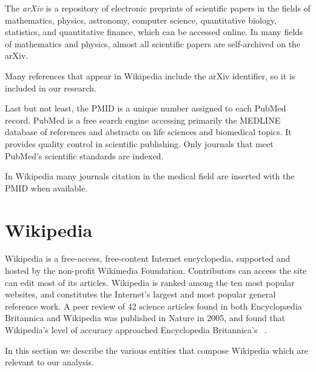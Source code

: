 The \emph{arXiv} is a repository of electronic preprints of scientific papers in the fields of mathematics, physics, astronomy, computer science, quantitative biology, statistics, and quantitative finance, which can be accessed online.
In many fields of mathematics and physics, almost all scientific papers are self-archived on the arXiv.

Many references that appear in Wikipedia include the arXiv identifier, so it is included in our research.

Last but not least, the \acf{PMID} is a unique number assigned to each PubMed record.
PubMed is a free search engine accessing primarily the MEDLINE database of references and abstracts on life sciences and biomedical topics.
It provides quality control in scientific publishing. Only journals that meet PubMed's scientific standards are indexed.

In Wikipedia many journals citation in the medical field are inserted with the \ac{PMID} when available.



\section{Wikipedia}
\label{sec:wiki}
Wikipedia is a free-access, free-content Internet encyclopedia, supported and hosted by the non-profit Wikimedia Foundation.
Contributors can access the site can edit most of its articles.
Wikipedia is ranked among the ten most popular websites, and constitutes the Internet's largest and most popular general reference work.
A peer review of 42 science articles found in both Encyclopædia Britannica and Wikipedia was published in Nature in 2005, and found that Wikipedia's level of accuracy approached Encyclopedia Britannica's~\cite{Giles2005} .


In this section we describe the various entities that compose Wikipedia which are relevant to our analysis.

